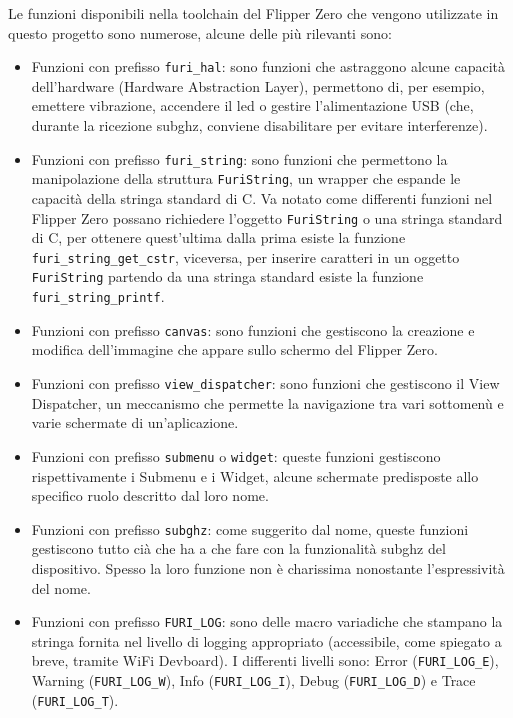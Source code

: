 Le funzioni disponibili nella toolchain del Flipper Zero che vengono utilizzate in questo progetto sono numerose, alcune delle più rilevanti sono:
\begin{itemize}
  \item Funzioni con prefisso \texttt{furi\_hal}: sono funzioni che astraggono alcune capacità dell'hardware (Hardware Abstraction Layer), permettono di, per esempio, emettere vibrazione, accendere il led o gestire l'alimentazione USB (che, durante la ricezione subghz, conviene disabilitare per evitare interferenze).
  \item Funzioni con prefisso \texttt{furi\_string}: sono funzioni che permettono la manipolazione della struttura \texttt{FuriString}, un wrapper che espande le capacità della stringa standard di C. Va notato come differenti funzioni nel Flipper Zero possano richiedere l'oggetto \texttt{FuriString} o una stringa standard di C, per ottenere quest'ultima dalla prima esiste la funzione \texttt{furi\_string\_get\_cstr}, viceversa, per inserire caratteri in un oggetto \texttt{FuriString} partendo da una stringa standard esiste la funzione \texttt{furi\_string\_printf}.
  \item Funzioni con prefisso \texttt{canvas}: sono funzioni che gestiscono la creazione e modifica dell'immagine che appare sullo schermo del Flipper Zero.
  \item Funzioni con prefisso \texttt{view\_dispatcher}: sono funzioni che gestiscono il View Dispatcher, un meccanismo che permette la navigazione tra vari sottomenù e varie schermate di un'aplicazione.
  \item Funzioni con prefisso \texttt{submenu} o \texttt{widget}: queste funzioni gestiscono rispettivamente i Submenu e i Widget, alcune schermate predisposte allo specifico ruolo descritto dal loro nome.
  \item Funzioni con prefisso \texttt{subghz}: come suggerito dal nome, queste funzioni gestiscono tutto cià che ha a che fare con la funzionalità subghz del dispositivo. Spesso la loro funzione non è charissima nonostante l'espressività del nome.
  \item Funzioni con prefisso \texttt{FURI\_LOG}: sono delle macro variadiche che stampano la stringa fornita nel livello di logging appropriato (accessibile, come spiegato a breve, tramite WiFi Devboard). I differenti livelli sono: Error (\texttt{FURI\_LOG\_E}), Warning (\texttt{FURI\_LOG\_W}), Info (\texttt{FURI\_LOG\_I}), Debug (\texttt{FURI\_LOG\_D}) e Trace (\texttt{FURI\_LOG\_T}).
\end{itemize}

